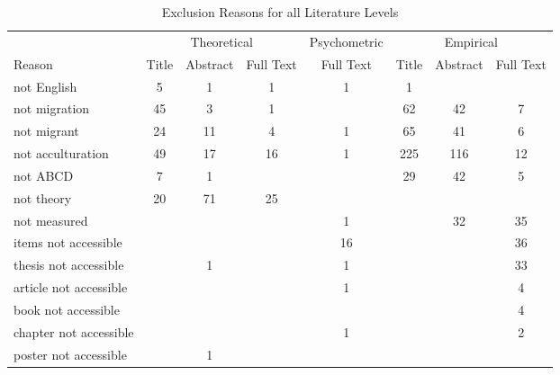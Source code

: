 \begin{table}
\begin{minipage}[t][\textheight][t]{\textwidth}

\caption{\label{tab:ExclusionsCombined}Exclusion Reasons for all Literature Levels}
\begin{tabular}[t]{lccccccc}
\toprule
\multicolumn{1}{c}{ } & \multicolumn{3}{c}{Theoretical} & \multicolumn{1}{c}{Psychometric} & \multicolumn{3}{c}{Empirical} \\
\cmidrule(l{3pt}r{3pt}){2-4} \cmidrule(l{3pt}r{3pt}){5-5} \cmidrule(l{3pt}r{3pt}){6-8}
Reason & Title & Abstract & Full Text & Full Text & Title & Abstract & Full Text\\
\midrule
not English & 5 & 1 & 1 & 1 & 1 &  & \\
not migration & 45 & 3 & 1 &  & 62 & 42 & 7\\
not migrant & 24 & 11 & 4 & 1 & 65 & 41 & 6\\
not acculturation & 49 & 17 & 16 & 1 & 225 & 116 & 12\\
not ABCD & 7 & 1 &  &  & 29 & 42 & 5\\
not theory & 20 & 71 & 25 &  &  &  & \\
not measured &  &  &  & 1 &  & 32 & 35\\
items not accessible &  &  &  & 16 &  &  & 36\\
thesis not accessible &  & 1 &  & 1 &  &  & 33\\
article not accessible &  &  &  & 1 &  &  & 4\\
book not accessible &  &  &  &  &  &  & 4\\
chapter not accessible &  &  &  & 1 &  &  & 2\\
poster not accessible &  & 1 &  &  &  &  & \\
\bottomrule
\end{tabular}
\end{minipage}
\end{table}
